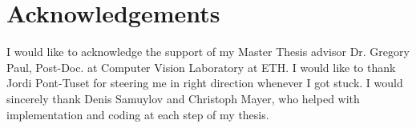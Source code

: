 %
\chapter*{Acknowledgements}
I would like to acknowledge the support of my Master Thesis advisor Dr. Gregory Paul, Post-Doc. at Computer Vision Laboratory at ETH. I would like to thank Jordi Pont-Tuset for steering me in right direction whenever I got stuck. I would sincerely thank Denis Samuylov and Christoph Mayer, who helped with implementation and coding at each step of my thesis. 

